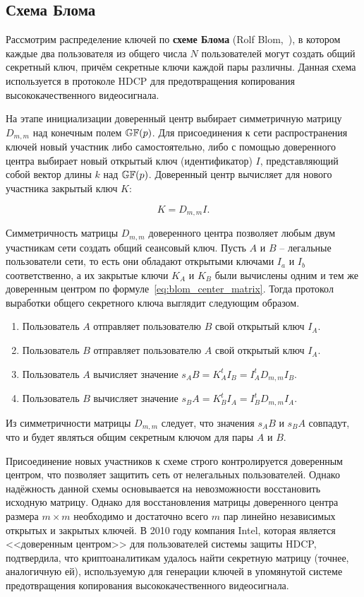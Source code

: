 \subsection{Схема Блома}

Рассмотрим распределение ключей по \textbf{схеме Блома} (Rolf Blom,~\cite{Blom:1984, Blom:1985}), в котором каждые два пользователя из общего числа $N$ пользователей могут создать общий секретный ключ, причём секретные ключи каждой пары различны. Данная схема используется в протоколе HDCP для предотвращения копирования высококачественного видеосигнала.

На этапе инициализации доверенный центр выбирает симметричную матрицу $D_{m,m}$ над конечным полем $\mathbb{GF}(p)$. Для присоединения к сети распространения ключей новый участник либо самостоятельно, либо с помощью доверенного центра выбирает новый открытый ключ (идентификатор) $I$, представляющий собой вектор длины $k$ над $\mathbb{GF}(p)$. Доверенный центр вычисляет для нового участника закрытый ключ $K$:

\begin{equation}
	K = D_{m,m} I.
	\label{eq:blom_center_matrix}
\end{equation}

Симметричность матрицы $D_{m,m}$ доверенного центра позволяет любым двум участникам сети создать общий сеансовый ключ. Пусть $A$ и $B$ -- легальные пользователи сети, то есть они обладают открытыми ключами $I_a$ и $I_b$ соответственно, а их закрытые ключи $K_A$ и $K_B$ были вычислены одним и тем же доверенным центром по формуле~\ref{eq:blom_center_matrix}. Тогда протокол выработки общего секретного ключа выглядит следующим образом.

\begin{enumerate}
	\item Пользователь $A$ отправляет пользователю $B$ свой открытый ключ $I_A$.
	\item Пользователь $B$ отправляет пользователю $A$ свой открытый ключ $I_A$.
	\item Пользователь $A$ вычисляет значение $s_AB = K^t_A I_B = I^t_A D_{m,m} I_B$.
	\item Пользователь $B$ вычисляет значение $s_BA = K^t_B I_A = I^t_B D_{m,m} I_A$.
\end{enumerate}

Из симметричности матрицы $D_{m,m}$ следует, что значения $s_AB$ и $s_BA$ совпадут, что и будет являться общим секретным ключом для пары $A$ и $B$.

Присоединение новых участников к схеме строго контролируется доверенным центром, что позволяет защитить сеть от нелегальных пользователей. Однако надёжность данной схемы основывается на невозможности восстановить исходную матрицу. Однако для восстановления матрицы доверенного центра размера $m \times m$ необходимо и достаточно всего $m$ пар линейно независимых открытых и закрытых ключей. В 2010 году компания Intel, которая является <<доверенным центром>> для пользователей системы защиты HDCP, подтвердила, что криптоаналитикам удалось найти секретную матрицу (точнее, аналогичную ей), используемую для генерации ключей в упомянутой системе предотвращения копирования высококачественного видеосигнала.